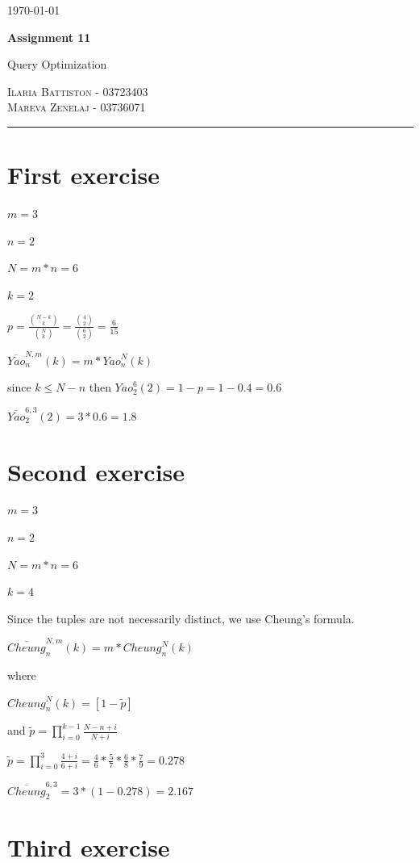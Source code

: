 \documentclass[12pt]{article}
\begin{document}
	
	
	\begin{flushright}
		\today
	\end{flushright}
	{\Large \textbf{Assignment 11}}
	
	{\large Query Optimization}
	
	\textsc{Ilaria Battiston - 03723403} \\
	\textsc{Mareva Zenelaj - 03736071}
	
	\rule{\linewidth}{0.5pt}
	
	\section{First exercise}
	
	$m = 3$ 
	
	$n = 2$ 
	
	$N = m * n = 6$ 
	
	$k = 2$ 
	
	$p = \frac{\binom{N - k}{k}}{\binom{N}{k}} = \frac{\binom{4}{2}}{\binom{6}{2}} = \frac{6}{15}$
	
	$\overline{{Yao}}_n^{N,m} (k) = m * {Yao}_n^N (k)$
	
	since $k \leq N - n$ then ${Yao}_2^6 (2) = 1 - p = 1 - 0.4 = 0.6$
	
	$\overline{{Yao}}_2^{6,3} (2) = 3 * 0.6 = 1.8$
	
	\section{Second exercise}
	
	$m = 3$ 
	
	$n = 2$ 
	
	$N = m * n = 6$ 
	
	$k = 4$ 
	
	Since the tuples are not necessarily distinct, we use Cheung's formula. 
	
	$\overline{{Cheung}}_n^{N,m} (k) = m * {Cheung}_n^N (k)$
	
	where 
	
    ${Cheung}_n^N (k) = [1-\tilde{p}]$
    
    and $\tilde{p} = \prod_{i=0}^{k-1} \frac{N-n+i}{N+i}$
    
    $\tilde{p} = \prod_{i=0}^{3} \frac{4+i}{6+i} = \frac{4}{6} * \frac{5}{7} * \frac{6}{8} * \frac{7}{9} = 0.278$
    
    $\overline{{Cheung}}_2^{6,3} = 3 * (1 - 0.278) = 2.167 $
    
    \section{Third exercise}
    
\end{document}
